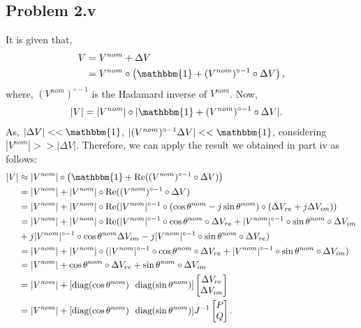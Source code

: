 \subsection*{Problem 2.v}
It is given that,
\begin{align*}
	V &= V^{nom} + \Delta V\\
	&= V^{nom} \circ \left(\mathbbm{1} + (V^{nom})^{\circ -1}\circ \Delta V\right),
\end{align*}
where, $(V^{nom})^{\circ -1}$ is the Hadamard inverse of $V^{nom}$. Now,
\begin{align*}
	|V| &= |V^{nom}| \circ |\mathbbm{1}+(V^{nom})^{\circ -1}\circ\Delta V|.
\end{align*}
As, $|\Delta V| << \mathbbm{1}$, $|(V^{nom})^{\circ -1}\Delta V| << \mathbbm{1}$, considering $|V^{nom}| >> |\Delta V|$. Therefore, we can apply the result we obtained in part iv as follows:
\begin{align*}
	|V| &\approx |V^{nom}| \circ \left(\mathbbm{1} + \text{Re}((V^{nom})^{\circ -1}\circ\Delta V)\right)\\
	&= |V^{nom}| + |V^{nom}| \circ \text{Re}((V^{nom})^{\circ -1}\circ\Delta V)\\
	&= |V^{nom}| + |V^{nom}| \circ \text{Re} (|V^{nom}|^{\circ-1} \circ (\cos \theta^{nom}-j\sin\theta^{nom})\circ (\Delta V_{re} + j \Delta V_{im}))\\
	&= |V^{nom}| + |V^{nom}| \circ \text{Re}(|V^{nom}|^{\circ-1} \circ \cos\theta^{nom} \circ \Delta V_{re} + |V^{nom}|^{\circ-1} \circ \sin\theta^{nom}\circ \Delta V_{im}\\
	& + j |V^{nom}|^{\circ-1} \circ \cos\theta^{nom}\Delta V_{im}-j|V^{nom}|^{\circ-1} \circ \sin\theta^{nom}\circ \Delta V_{re})\\
	&= |V^{nom}| + |V^{nom}| \circ (|V^{nom}|^{\circ-1} \circ \cos\theta^{nom} \circ \Delta V_{re} + |V^{nom}|^{\circ-1} \circ \sin\theta^{nom}\circ \Delta V_{im})\\
	&= |V^{nom}| + \cos\theta^{nom} \circ \Delta V_{re} +  \sin\theta^{nom}\circ \Delta V_{im}\\
	&= |V^{nom}| + [\text{diag}(\cos\theta^{nom})\ \ \text{diag}(\sin\theta^{nom})]\begin{bmatrix}
		\Delta V_{re}\\\Delta V_{im}
	\end{bmatrix}\\
	&= |V^{nom}| + [\text{diag}(\cos\theta^{nom})\ \ \text{diag}(\sin\theta^{nom})]J^{-1}\begin{bmatrix}
	P\\Q
	\end{bmatrix}.
\end{align*}
